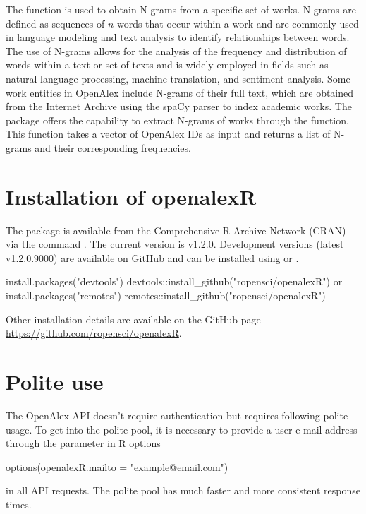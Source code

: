 The  function is used to obtain N-grams from a specific set of works. N-grams are defined as sequences of $n$ words that occur within a work and are commonly used in language modeling and text analysis to identify relationships between words. The use of N-grams allows for the analysis of the frequency and distribution of words within a text or set of texts and is widely employed in fields such as natural language processing, machine translation, and sentiment analysis. Some work entities in OpenAlex include N-grams of their full text, which are obtained from the Internet Archive using the spaCy parser to index academic works. The  package offers the capability to extract N-grams of works through the  function. This function takes a vector of OpenAlex IDs as input and returns a list of N-grams and their corresponding frequencies.



\section{Installation of openalexR}
The package is available from the Comprehensive R Archive Network (CRAN) via the command
. 
The current version is v1.2.0. 
Development versions (latest v1.2.0.9000) are available on GitHub and can be installed using  \citep{devtools} or  \citep{remotes}. 
\begin{example}
install.packages("devtools")
devtools::install_github("ropensci/openalexR")
or
install.packages("remotes")
remotes::install_github("ropensci/openalexR")
\end{example}
Other installation details are available on the GitHub page \url{https://github.com/ropensci/openalexR}.

\section{Polite use}
The OpenAlex API doesn't require authentication but requires following polite usage. To get into the polite pool, it is necessary to provide a user e-mail address through the  parameter in R options 

\begin{example}
options(openalexR.mailto = "example@email.com")
\end{example}
in all API requests. The polite pool has much faster and more consistent response times. 



